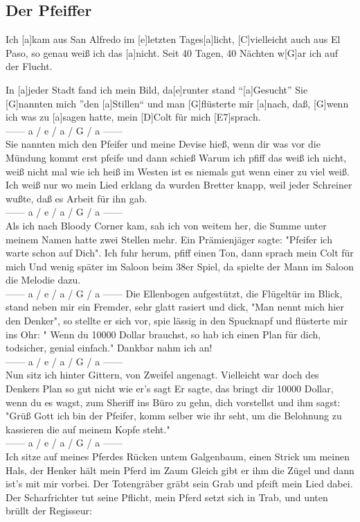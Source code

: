 \documentclass[10pt,a5paper,twoside]{scrbook}
\begin{document}
  	
  	  
     \newpage  
  	
\subsection{Der Pfeiffer}
  \begin{guitar}

Ich [a]kam aus San Alfredo im [e]letzten Tages[a]licht,
[C]vielleicht auch aus El Paso, so genau weiß ich das [a]nicht.
Seit 40 Tagen, 40 Nächten w[G]ar ich auf der Flucht.

In [a]jeder Stadt fand ich mein Bild, da[e]runter stand ``[a]Gesucht''
Sie [G]nannten mich ''den [a]Stillen`` und man [G]flüsterte mir [a]nach,
daß, [G]wenn ich was zu [a]sagen hatte, mein [D]Colt für mich [E7]sprach.
\\
 ------ a / e / a / G / a ------
\\
Sie nannten mich den Pfeifer und meine Devise hieß,
wenn dir was vor die Mündung kommt erst pfeife und dann schieß
Warum ich pfiff das weiß ich nicht, weiß nicht mal wie ich heiß
im Westen ist es niemals gut wenn einer zu viel weiß.
Ich weiß nur wo mein Lied erklang da wurden Bretter knapp,
weil jeder Schreiner wußte, daß es Arbeit für ihn gab.
\\
 ------ a / e / a / G / a ------
\\
Als ich nach Bloody Corner kam, sah ich von weitem her,
die Summe unter meinem Namen hatte zwei Stellen mehr.
Ein Prämienjäger sagte: "Pfeifer ich warte schon auf Dich".
Ich fuhr herum, pfiff einen Ton, dann sprach mein Colt für mich
Und wenig später im Saloon beim 38er Spiel,
da spielte der Mann im Saloon die Melodie dazu.
\\
 ------ a / e / a / G / a ------
\newpage
Die Ellenbogen aufgestützt, die Flügeltür im Blick,
stand neben mir ein Fremder, sehr glatt rasiert und dick,
"Man nennt mich hier den Denker", so stellte er sich vor,
spie lässig in den Spucknapf und flüsterte mir ins Ohr:
" Wenn du 10000 Dollar brauchst, so hab ich einen Plan für dich,
todsicher, genial einfach." Dankbar nahm ich an!
\\
 ------ a / e / a / G / a ------
\\
Nun sitz ich hinter Gittern, von Zweifel angenagt.
Vielleicht war doch des Denkers Plan so gut nicht wie er's sagt
Er sagte, das bringt dir 10000 Dollar, wenn du es wagst,
zum Sheriff ins Büro zu gehn, dich vorstellst und ihm sagst:
"Grüß Gott ich bin der Pfeifer, komm selber wie ihr seht,
um die Belohnung zu kassieren die auf meinem Kopfe steht."
\\
 ------ a / e / a / G / a ------
\\
Ich sitze auf meines Pferdes Rücken untem Galgenbaum,
einen Strick um meinen Hals, der Henker hält mein Pferd im Zaum
Gleich gibt er ihm die Zügel und dann ist's mit mir vorbei.
Der Totengräber gräbt sein Grab und pfeift mein Lied dabei.
Der Scharfrichter tut seine Pflicht, mein Pferd setzt sich in Trab,
und unten brüllt der Regisseur:


\end{guitar}
\end{document}
